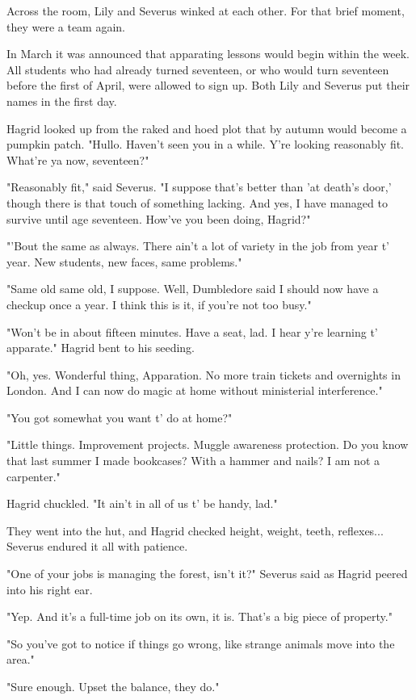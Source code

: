 \documentclass[a4paper,11pt]{article}
\begin{document}
Across the room, Lily and Severus winked at each other. For that brief moment, they were a team again.

In March it was announced that apparating lessons would begin within the week. All students who had already turned seventeen, or who would turn seventeen before the first of April, were allowed to sign up. Both Lily and Severus put their names in the first day.

Hagrid looked up from the raked and hoed plot that by autumn would become a pumpkin patch. "Hullo. Haven't seen you in a while. Y're looking reasonably fit. What're ya now, seventeen?"

"Reasonably fit," said Severus. "I suppose that's better than 'at death's door,' though there is that touch of something lacking. And yes, I have managed to survive until age seventeen. How've you been doing, Hagrid?"

"'Bout the same as always. There ain't a lot of variety in the job from year t' year. New students, new faces, same problems."

"Same old same old, I suppose. Well, Dumbledore said I should now have a checkup once a year. I think this is it, if you're not too busy."

"Won't be in about fifteen minutes. Have a seat, lad. I hear y're learning t' apparate." Hagrid bent to his seeding.

"Oh, yes. Wonderful thing, Apparation. No more train tickets and overnights in London. And I can now do magic at home without ministerial interference."

"You got somewhat you want t' do at home?"

"Little things. Improvement projects. Muggle awareness protection. Do you know that last summer I made bookcases? With a hammer and nails? I am not a carpenter."

Hagrid chuckled. "It ain't in all of us t' be handy, lad."

They went into the hut, and Hagrid checked height, weight, teeth, reflexes... Severus endured it all with patience.

"One of your jobs is managing the forest, isn't it?" Severus said as Hagrid peered into his right ear.

"Yep. And it's a full-time job on its own, it is. That's a big piece of property."

"So you've got to notice if things go wrong, like strange animals move into the area."

"Sure enough. Upset the balance, they do."
\end{document}
